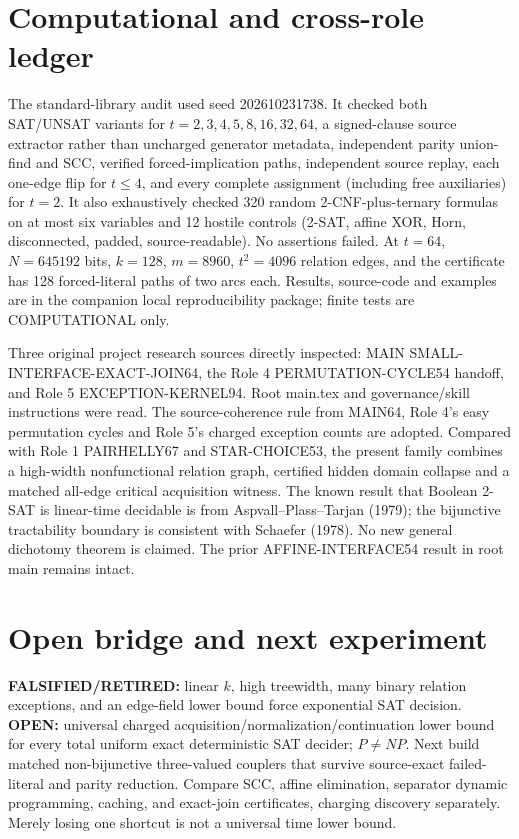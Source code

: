 \documentclass[11pt]{article}
\begin{document}
\section{Computational and cross-role ledger}
The standard-library audit used seed 202610231738. It checked both SAT/UNSAT variants for $t=2,3,4,5,8,16,32,64$, a signed-clause source extractor rather than uncharged generator metadata, independent parity union-find and SCC, verified forced-implication paths, independent source replay, each one-edge flip for $t\le4$, and every complete assignment (including free auxiliaries) for $t=2$. It also exhaustively checked 320 random 2-CNF-plus-ternary formulas on at most six variables and 12 hostile controls (2-SAT, affine XOR, Horn, disconnected, padded, source-readable). No assertions failed. At $t=64$, $N=645192$ bits, $k=128$, $m=8960$, $t^2=4096$ relation edges, and the certificate has 128 forced-literal paths of two arcs each. Results, source-code and examples are in the companion local reproducibility package; finite tests are COMPUTATIONAL only.

Three original project research sources directly inspected: MAIN SMALL-INTERFACE-EXACT-JOIN64, the Role 4 PERMUTATION-CYCLE54 handoff, and Role 5 EXCEPTION-KERNEL94. Root main.tex and governance/skill instructions were read. The source-coherence rule from MAIN64, Role 4's easy permutation cycles and Role 5's charged exception counts are adopted. Compared with Role 1 PAIRHELLY67 and STAR-CHOICE53, the present family combines a high-width nonfunctional relation graph, certified hidden domain collapse and a matched all-edge critical acquisition witness. The known result that Boolean 2-SAT is linear-time decidable is from Aspvall--Plass--Tarjan (1979); the bijunctive tractability boundary is consistent with Schaefer (1978). No new general dichotomy theorem is claimed. The prior AFFINE-INTERFACE54 result in root main remains intact.

\section{Open bridge and next experiment}
\textbf{FALSIFIED/RETIRED:} linear $k$, high treewidth, many binary relation exceptions, and an edge-field lower bound force exponential SAT decision. \textbf{OPEN:} universal charged acquisition/normalization/continuation lower bound for every total uniform exact deterministic SAT decider; $P\ne NP$. Next build matched non-bijunctive three-valued couplers that survive source-exact failed-literal and parity reduction. Compare SCC, affine elimination, separator dynamic programming, caching, and exact-join certificates, charging discovery separately. Merely losing one shortcut is not a universal time lower bound.
\end{document}

